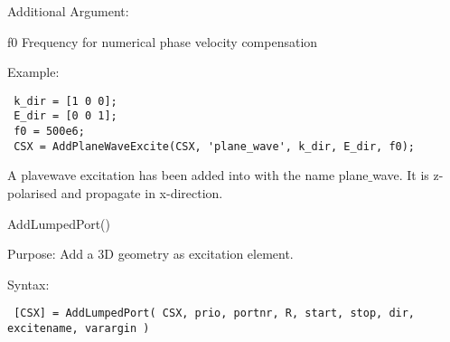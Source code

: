 \begin{FontDescr}{Additional Argument:}
\begin{FontPara}{f0}
Frequency for numerical phase velocity compensation
\end{FontPara}
\end{FontDescr}

\begin{FontDescr}{Example:}
\begin{lstlisting} 
 k_dir = [1 0 0]; 
 E_dir = [0 0 1]; 
 f0 = 500e6;      
 CSX = AddPlaneWaveExcite(CSX, 'plane_wave', k_dir, E_dir, f0);
\end{lstlisting}
A plavewave excitation has been added into\hyperref[CSX]{} with the name plane$\_$wave. It is z-polarised and propagate in x-direction.  
\end{FontDescr}


\begin{FontNameFunct}{AddLumpedPort()}
\end{FontNameFunct}

\begin{FontDescr}{Purpose:}
Add a 3D geometry as excitation element.
\end{FontDescr}

\begin{FontDescr}{Syntax:}
  \begin{lstlisting}
 [CSX] = AddLumpedPort( CSX, prio, portnr, R, start, stop, dir, excitename, varargin )
  \end{lstlisting}
\end{FontDescr}

